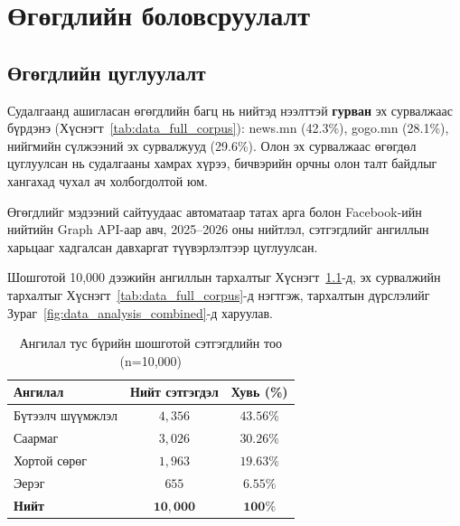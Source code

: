 ﻿%

\chapter{Өгөгдлийн боловсруулалт}
\label{Chapter4}

\section{Өгөгдлийн цуглуулалт}

Судалгаанд ашигласан өгөгдлийн багц нь нийтэд нээлттэй \textbf{гурван} эх
сурвалжаас бүрдэнэ (Хүснэгт~\ref{tab:data_full_corpus}): news.mn (42.3\%),
gogo.mn (28.1\%), нийгмийн сүлжээний эх сурвалжууд (29.6\%).
Олон эх сурвалжаас өгөгдөл цуглуулсан нь судалгааны хамрах хүрээ, бичвэрийн
орчны олон талт байдлыг хангахад чухал ач холбогдолтой юм.

Өгөгдлийг мэдээний сайтуудаас автоматаар татах арга болон Facebook-ийн
нийтийн Graph API-аар авч, 2025--2026 оны нийтлэл, сэтгэгдлийг ангиллын
харьцааг хадгалсан давхаргат түүвэрлэлтээр цуглуулсан.

Шошготой 10,000 дээжийн ангиллын тархалтыг Хүснэгт~\ref{tab:collection}-д,
эх сурвалжийн тархалтыг Хүснэгт~\ref{tab:data_full_corpus}-д нэгтгэж,
тархалтын дүрслэлийг Зураг~\ref{fig:data_analysis_combined}-д харуулав.

\begin{table}[H]
\centering
\caption{Ангилал тус бүрийн шошготой сэтгэгдлийн тоо (n=10{,}000)}
\label{tab:collection}
\begin{tabular}{@{}lcc@{}}
\toprule
\textbf{Ангилал} & \textbf{Нийт сэтгэгдэл} & \textbf{Хувь (\%)} \\
\midrule
Бүтээлч шүүмжлэл  & $4{,}356$ & $43.56\%$ \\
Саармаг           & $3{,}026$ & $30.26\%$ \\
Хортой сөрөг      & $1{,}963$ & $19.63\%$ \\
Эерэг             & $655$     & $6.55\%$  \\
\midrule
\textbf{Нийт}   & $\mathbf{10{,}000}$ & $\mathbf{100\%}$ \\
\bottomrule
\end{tabular}
\end{table}

